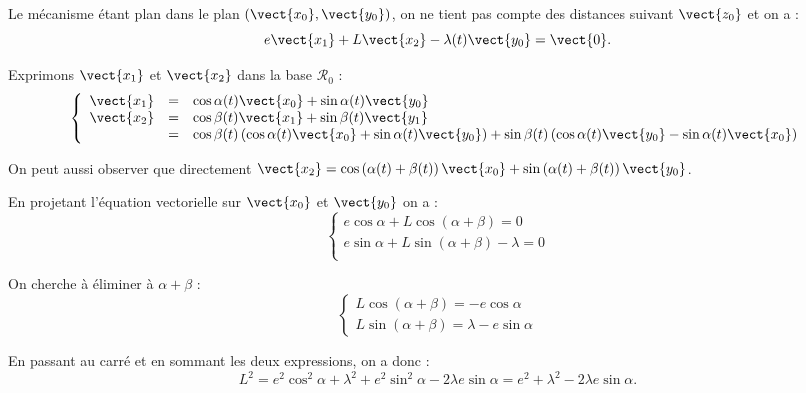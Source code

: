\begin{multicols}{2}
\begin{corrige}
Le mécanisme étant plan dans le plan $\left(\vect{x_0},\vect{y_0}\right)$, on ne tient pas compte des distances suivant $\vect{z_0}$ et on a : 
$$e\vect{x_1}+L\vect{x_2}-\lambda(t)\vect{y_0}= \vect{0}.$$



Exprimons $\vect{x_1}$ et $\vect{x_2}$ dans la base $\mathcal{R}_0$ :
$$
\left\{
\begin{array}{lcl}
\vect{x_1} & = & \cos \alpha(t) \vect{x_0} + \sin \alpha(t) \vect{y_0} \\
\vect{x_2} & = & \cos \beta(t) \vect{x_1} + \sin \beta(t) \vect{y_1} \\
 & = & \cos \beta(t) \left( \cos \alpha(t) \vect{x_0} + \sin \alpha(t) \vect{y_0} \right) + 
\sin \beta(t) \left( \cos \alpha(t) \vect{y_0} - \sin \alpha(t) \vect{x_0} \right) \\
\end{array}
\right.
$$

On peut aussi observer que directement 
$\vect{x_2} =\cos\left(\alpha(t)+\beta(t) \right)\vect{x_0} + \sin\left(\alpha(t)+\beta(t) \right)\vect{y_0}$.

En projetant l'équation vectorielle sur $\vect{x_0}$ et $\vect{y_0}$ on a : 
$$
\left\{
\begin{array}{l}
e\cos\alpha+ L \cos\left(\alpha+\beta\right)  = 0 \\
e\sin\alpha +  L \sin\left(\alpha+\beta \right) - \lambda= 0 \\
\end{array}
\right.
$$

On cherche à éliminer à $\alpha+\beta$ :
$$
\left\{
\begin{array}{l}
L\cos\left(\alpha+\beta\right)  = - e\cos\alpha \\
L \sin\left(\alpha+\beta\right) =  \lambda - e\sin\alpha
\end{array}
\right.
$$

En passant au carré et en sommant les deux expressions, on a donc : 
$$
L^2=e^2\cos^2\alpha + \lambda^2 + e^2\sin^2\alpha-2\lambda e \sin\alpha
=e^2+ \lambda^2 -2\lambda e \sin\alpha.
$$


\end{corrige}
\end{multicols}

